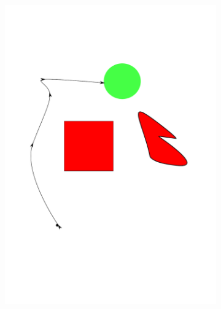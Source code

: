 \documentclass[../thesis.tex]{subfiles}
\begin{document}
\begin{figure}
\begin{subfigure}[b]{0.24\linewidth}
    \includegraphics[width=\linewidth]{./Planning/trajectory_2.pdf}    
  \end{subfigure}
  \begin{subfigure}[b]{0.24\linewidth}

\end{subfigure}
\end{figure}
\end{document}
